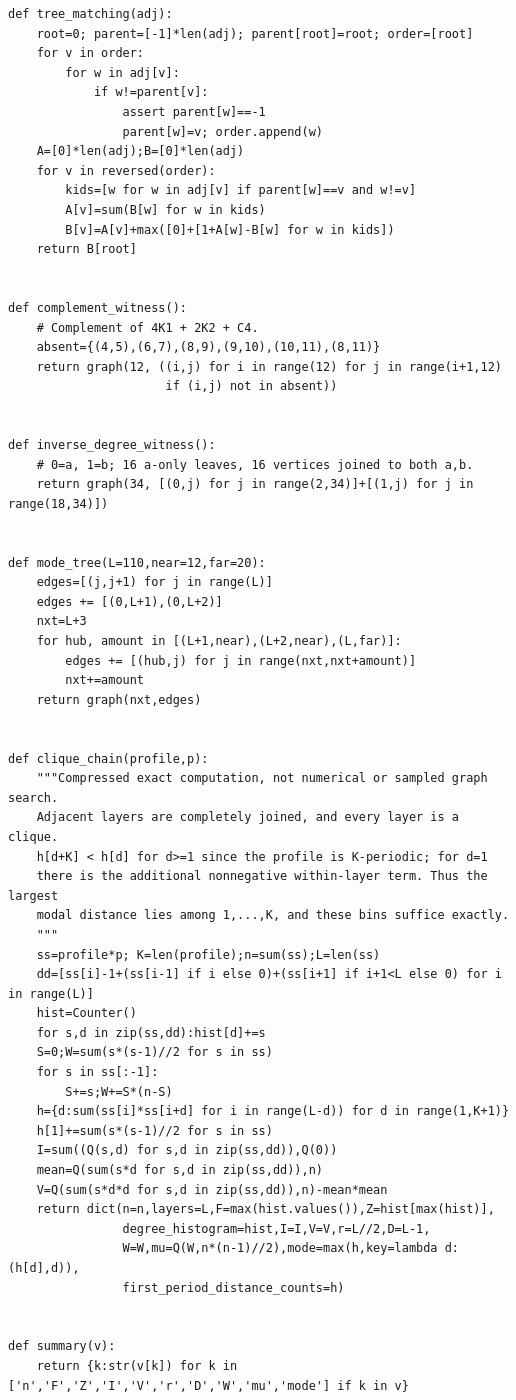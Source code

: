 \documentclass[11pt,a4paper]{article}
\theoremstyle{remark}\newtheorem{remark}[theorem]{Remark}
\begin{document}
\begin{lstlisting}
def tree_matching(adj):
    root=0; parent=[-1]*len(adj); parent[root]=root; order=[root]
    for v in order:
        for w in adj[v]:
            if w!=parent[v]:
                assert parent[w]==-1
                parent[w]=v; order.append(w)
    A=[0]*len(adj);B=[0]*len(adj)
    for v in reversed(order):
        kids=[w for w in adj[v] if parent[w]==v and w!=v]
        A[v]=sum(B[w] for w in kids)
        B[v]=A[v]+max([0]+[1+A[w]-B[w] for w in kids])
    return B[root]


def complement_witness():
    # Complement of 4K1 + 2K2 + C4.
    absent={(4,5),(6,7),(8,9),(9,10),(10,11),(8,11)}
    return graph(12, ((i,j) for i in range(12) for j in range(i+1,12)
                      if (i,j) not in absent))


def inverse_degree_witness():
    # 0=a, 1=b; 16 a-only leaves, 16 vertices joined to both a,b.
    return graph(34, [(0,j) for j in range(2,34)]+[(1,j) for j in range(18,34)])


def mode_tree(L=110,near=12,far=20):
    edges=[(j,j+1) for j in range(L)]
    edges += [(0,L+1),(0,L+2)]
    nxt=L+3
    for hub, amount in [(L+1,near),(L+2,near),(L,far)]:
        edges += [(hub,j) for j in range(nxt,nxt+amount)]
        nxt+=amount
    return graph(nxt,edges)


def clique_chain(profile,p):
    """Compressed exact computation, not numerical or sampled graph search.
    Adjacent layers are completely joined, and every layer is a clique.
    h[d+K] < h[d] for d>=1 since the profile is K-periodic; for d=1
    there is the additional nonnegative within-layer term. Thus the largest
    modal distance lies among 1,...,K, and these bins suffice exactly.
    """
    ss=profile*p; K=len(profile);n=sum(ss);L=len(ss)
    dd=[ss[i]-1+(ss[i-1] if i else 0)+(ss[i+1] if i+1<L else 0) for i in range(L)]
    hist=Counter()
    for s,d in zip(ss,dd):hist[d]+=s
    S=0;W=sum(s*(s-1)//2 for s in ss)
    for s in ss[:-1]:
        S+=s;W+=S*(n-S)
    h={d:sum(ss[i]*ss[i+d] for i in range(L-d)) for d in range(1,K+1)}
    h[1]+=sum(s*(s-1)//2 for s in ss)
    I=sum((Q(s,d) for s,d in zip(ss,dd)),Q(0))
    mean=Q(sum(s*d for s,d in zip(ss,dd)),n)
    V=Q(sum(s*d*d for s,d in zip(ss,dd)),n)-mean*mean
    return dict(n=n,layers=L,F=max(hist.values()),Z=hist[max(hist)],
                degree_histogram=hist,I=I,V=V,r=L//2,D=L-1,
                W=W,mu=Q(W,n*(n-1)//2),mode=max(h,key=lambda d:(h[d],d)),
                first_period_distance_counts=h)


def summary(v):
    return {k:str(v[k]) for k in ['n','F','Z','I','V','r','D','W','mu','mode'] if k in v}



\end{lstlisting}
\end{document}
